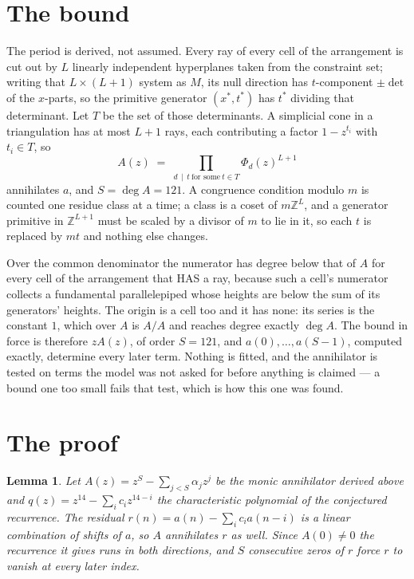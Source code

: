 \documentclass[11pt,a4paper]{article}
\theoremstyle{plain}
\newtheorem{lemma}[theorem]{Lemma}
\theoremstyle{definition}
\begin{document}
\section{The bound}

The period is derived, not assumed. Every ray of every cell of the arrangement is cut out by
$L$ linearly independent hyperplanes taken from the constraint set; writing that $L\times(L+1)$
system as $M$, its null direction has $t$-component $\pm\det$ of the $x$-parts, so the
primitive generator $(x^*,t^*)$ has $t^*$ dividing that determinant. Let $T$ be the set of
those determinants. A simplicial cone in a triangulation has at most $L+1$ rays, each
contributing a factor $1-z^{t_i}$ with $t_i\in T$, so
\[
A(z)\;=\;\prod_{d\,\mid\,t\ \text{for some}\ t\in T}\Phi_d(z)^{L+1}
\]
annihilates $a$, and $S=\deg A=121$. A congruence condition modulo $m$ is counted one residue
class at a time; a class is a coset of $m\mathbb{Z}^L$, and a generator primitive in
$\mathbb{Z}^{L+1}$ must be scaled by a divisor of $m$ to lie in it, so each $t$ is replaced
by $mt$ and nothing else changes.

Over the common denominator the numerator has degree below that of $A$ for every cell of the
arrangement that HAS a ray, because such a cell's numerator collects a fundamental
parallelepiped whose heights are below the sum of its generators' heights. The origin is a cell
too and it has none: its series is the constant $1$, which over $A$ is $A/A$ and reaches degree
exactly $\deg A$. The bound in force is therefore $zA(z)$, of order $S=121$, and
$a(0),\dots,a(S-1)$, computed exactly, determine every later term. Nothing is fitted, and the
annihilator is tested on terms the model was not asked for before anything is claimed --- a
bound one too small fails that test, which is how this one was found.

\section{The proof}

\begin{lemma}\label{lem:crit}
Let $A(z)=z^S-\sum_{j<S}\alpha_jz^{j}$ be the monic annihilator derived above and
$q(z)=z^{14}-\sum_ic_iz^{14-i}$ the characteristic polynomial of the conjectured
recurrence. The residual $r(n)=a(n)-\sum_ic_ia(n-i)$ is a linear combination of shifts of $a$,
so $A$ annihilates $r$ as well. Since $A(0)\ne0$ the recurrence it gives runs in both
directions, and $S$ consecutive zeros of $r$ force $r$ to vanish at every later index.
\end{lemma}
\end{document}
